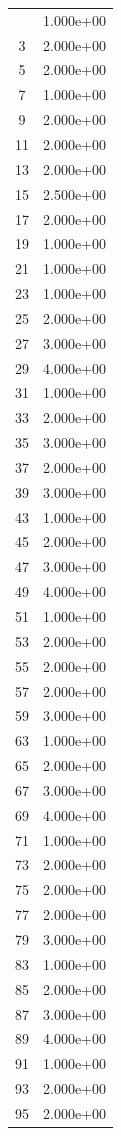 \documentclass[12pt]{article}
\begin{document}
\begin{longtable}{@{}cc@{}}
\bottomrule
\endlastfoot
1 & 1.000e+00 \\
3 & 2.000e+00 \\
5 & 2.000e+00 \\
7 & 1.000e+00 \\
9 & 2.000e+00 \\
11 & 2.000e+00 \\
13 & 2.000e+00 \\
15 & 2.500e+00 \\
17 & 2.000e+00 \\
19 & 1.000e+00 \\
21 & 1.000e+00 \\
23 & 1.000e+00 \\
25 & 2.000e+00 \\
27 & 3.000e+00 \\
29 & 4.000e+00 \\
31 & 1.000e+00 \\
33 & 2.000e+00 \\
35 & 3.000e+00 \\
37 & 2.000e+00 \\
39 & 3.000e+00 \\
43 & 1.000e+00 \\
45 & 2.000e+00 \\
47 & 3.000e+00 \\
49 & 4.000e+00 \\
51 & 1.000e+00 \\
53 & 2.000e+00 \\
55 & 2.000e+00 \\
57 & 2.000e+00 \\
59 & 3.000e+00 \\
63 & 1.000e+00 \\
65 & 2.000e+00 \\
67 & 3.000e+00 \\
69 & 4.000e+00 \\
71 & 1.000e+00 \\
73 & 2.000e+00 \\
75 & 2.000e+00 \\
77 & 2.000e+00 \\
79 & 3.000e+00 \\
83 & 1.000e+00 \\
85 & 2.000e+00 \\
87 & 3.000e+00 \\
89 & 4.000e+00 \\
91 & 1.000e+00 \\
93 & 2.000e+00 \\
95 & 2.000e+00 \\

\end{longtable}
\end{document}
